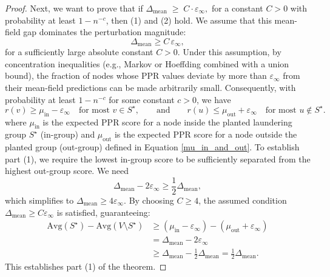 \documentclass[11pt,english]{article}
\begin{document}
\begin{proof}
\vspace{3mm}
\noindent Next, we want to prove that if $\Delta_{\mathrm{mean}} \;\ge\; C\cdot\varepsilon_{\infty},$ for a constant $C>0$ with probability at least $1-n^{-c}$, then (1) and (2) hold. 
We assume that this mean-field gap dominates the perturbation magnitude:
\[
\Delta_{\mathrm{mean}} \ge C\,\varepsilon_{\infty},
\]
for a sufficiently large absolute constant $C>0$.
Under this assumption, by concentration inequalities (e.g., Markov or Hoeffding combined with a union bound),
the fraction of nodes whose PPR values deviate by more than $\varepsilon_{\infty}$ from their mean-field predictions
can be made arbitrarily small.
Consequently, with probability at least $1 - n^{-c}$ for some constant $c>0$, we have
\[
r(v) \ge \mu_{\mathrm{in}} - \varepsilon_{\infty}
\quad \text{for most } v \in S^\star,
\qquad\text{and}\qquad
r(u) \le \mu_{\mathrm{out}} + \varepsilon_{\infty}
\quad \text{for most } u \notin S^\star.
\]
where $\mu_{\mathrm{in}}$ is the expected PPR score for a node inside the planted laundering group $S^\star$ (in-group) and $\mu_{\mathrm{out}}$ is the expected PPR score for a node outside the planted group (out-group) defined in Equation \ref{mu_in_and_out}.
To establish part (1), we require the lowest in-group score to be sufficiently separated from the highest out-group score. We need
\[
\Delta_{\mathrm{mean}} - 2\varepsilon_{\infty} \ge \frac{1}{2}\Delta_{\mathrm{mean}},
\]
which simplifies to $\Delta_{\mathrm{mean}} \ge 4\varepsilon_{\infty}$.
By choosing $C \ge 4$, the assumed condition $\Delta_{\mathrm{mean}} \ge C \varepsilon_{\infty}$ is satisfied, guaranteeing:
\begin{align*}
\text{Avg}(S^\star) - \text{Avg}(V \setminus S^\star) &\ge (\mu_{\mathrm{in}} - \varepsilon_{\infty}) - (\mu_{\mathrm{out}} + \varepsilon_{\infty}) \\
&= \Delta_{\mathrm{mean}} - 2\varepsilon_{\infty} \\
&\ge \Delta_{\mathrm{mean}} - \frac{1}{2}\Delta_{\mathrm{mean}} = \frac{1}{2}\Delta_{\mathrm{mean}}.
\end{align*}
This establishes part (1) of the theorem.



\end{proof}
\end{document}
